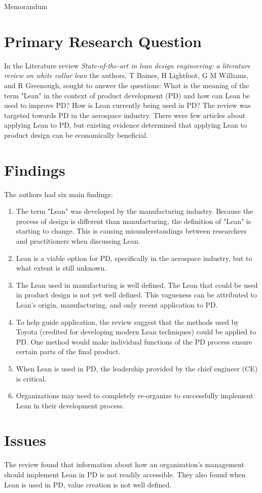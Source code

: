 \documentclass[letterpaper,13pt]{texMemo}
\begin{document}
\singlespace
\begin{center}
\large {Memorandum}
\end{center}
\setlength{\topmargin}{0in}
\maketitle
\section*{Primary Research Question}
\noindent
In the Literature review \emph{State-of-the-art in lean design engineering: a literature review on
white collar lean} the authors, T Baines, H Lightfoot, G M Williams, and R Greenough, sought to answer the
questions: What is the meaning of the term "Lean" in the context of product development (PD) and how
can Lean be used to improve PD? How is Lean currently being used in PD? The review was targeted
towards PD in the aerospace industry. There were few articles about applying Lean to PD, but
existing evidence determined that applying Lean to product design can be economically beneficial.

\section*{Findings}
The authors had six main findings:
\begin{enumerate}
\item
The term "Lean" was developed by the manufacturing industry. Because the process of design
is different than manufacturing, the definition of "Lean" is starting to change. This is causing
misunderstandings between researchers and practitioners when discussing Lean.

\item
Lean is a viable option for PD, specifically in the aerospace industry, but to what
extent is still unknown.

\item
The Lean used in manufacturing is well defined. The Lean that could be used in product
design is not yet well defined. This vagueness can be attributed to Lean's origin, manufacturing, and
only recent application to PD.

\item
To help guide application, the review suggest that the methods used by Toyota (credited for
developing modern Lean techniques) could be applied to PD. One method would make individual
functions of the PD process ensure certain parts of the final product.

\item
When Lean is used in PD, the leadership provided by the chief engineer (CE) is critical.

\item
Organizations may need to completely re-organize to successfully implement Lean in their development
process.
\end{enumerate}

\section*{Issues}
\noindent
The review found that information about how an organization's management should implement Lean in
PD is not readily accessible. They also found when Lean is used in PD, value creation is not well defined.
\end{document}
